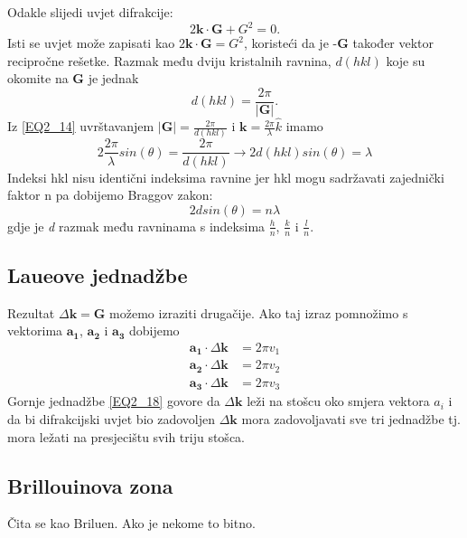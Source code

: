 \documentclass{article}
\numberwithin{equation}{section}
\begin{document}
   Odakle slijedi uvjet difrakcije:
   \begin{equation}
       2\mathbf{k\cdot G}+G^2=0.
       \label{EQ2_14}
   \end{equation}
   Isti se uvjet može zapisati kao $2\mathbf{k\cdot G}=G^2$, koristeći da je -\textbf{G} također vektor recipročne rešetke. Razmak među dviju kristalnih ravnina, $d(hkl)$ koje su okomite na \textbf{G} je jednak 
   \begin{equation}
       d(hkl)=\frac{2\pi}{\left| \mathbf{G}\right|}.
       \label{EQ2_15}
   \end{equation}
   Iz \ref{EQ2_14} uvrštavanjem $\left|\mathbf{G}\right|=\frac{2\pi}{d(hkl)}$ i $\mathbf{k}=\frac{2\pi}{\lambda} \hat{k}$ imamo 
   \begin{equation}
   2\frac{2\pi}{\lambda} sin(\theta)=\frac{2\pi}{d(hkl)} \rightarrow 2d(hkl)sin(\theta)=\lambda
       \label{EQ2_16}
   \end{equation}
   Indeksi hkl nisu identični indeksima ravnine jer hkl mogu sadržavati zajednički faktor n pa dobijemo Braggov zakon: 
   \begin{equation}
       2dsin(\theta)=n\lambda
       \label{EQ2_17}
   \end{equation}
   gdje je \textit{d} razmak među ravninama s indeksima $\frac{h}{n}$, $\frac{k}{n}$ i $\frac{l}{n}$. 
   \subsection{Laueove jednadžbe}
   Rezultat $\Delta \mathbf{k}=\mathbf{G}$ možemo izraziti drugačije. Ako taj izraz pomnožimo s vektorima $\mathbf{a_1}$, $\mathbf{a_2}$ i $\mathbf{a_3}$ dobijemo 
   \begin{equation}
   \begin{split}
       \mathbf{a_1}\cdot \Delta \mathbf{k} &= 2\pi v_1\\
       \mathbf{a_2}\cdot \Delta \mathbf{k} &= 2\pi v_2\\
       \mathbf{a_3}\cdot \Delta \mathbf{k} &= 2\pi v_3
    \end{split}
       \label{EQ2_18}
   \end{equation}
   Gornje jednadžbe \ref{EQ2_18} govore da $\Delta \mathbf{k}$ leži na stošcu oko smjera vektora $a_i$ i da bi difrakcijski uvjet bio zadovoljen $\Delta \mathbf{k}$ mora zadovoljavati sve tri jednadžbe tj. mora ležati na presjecištu svih triju stošca. 
   
\subsection{Brillouinova zona}
Čita se kao Briluen. Ako je nekome to bitno. \\
\end{document}
